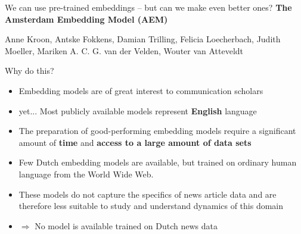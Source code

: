 \begin{frame}[plain]
	We can use pre-trained embeddings -- but can we make even better ones?
	\textbf{The Amsterdam Embedding Model (AEM)}\\
	
	
	\vspace{1cm}
	
	{\footnotesize{Anne Kroon, Antske Fokkens, Damian Trilling, Felicia Loecherbach, Judith Moeller, Mariken A. C. G. van der Velden, Wouter van Atteveldt} }
\end{frame}





\begin{frame}{Why do this?}
	\begin{itemize}
		\item Embedding models are of great interest to communication scholars
		\item yet... Most publicly available models represent \textbf{English} language
		\item The preparation of good-performing embedding models require a significant amount of \textbf{time} and \textbf{access to a large amount of data sets}
		\item Few Dutch embedding models are available, but trained on ordinary human language from the World Wide Web.
		\item These models do not capture the specifics of news article data and are therefore less suitable to study and understand dynamics of this domain
		\item $\Rightarrow$ No model is available trained on Dutch news data
	\end{itemize}
\end{frame}


